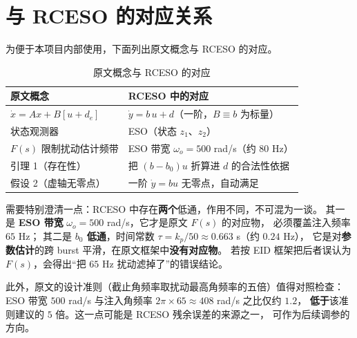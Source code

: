 \documentclass[11pt,a4paper]{ctexart}
\begin{document}
\appendix
\section{与 RCESO 的对应关系}

为便于本项目内部使用，下面列出原文概念与 RCESO 的对应。

\begin{table}[h]
\centering
\caption{原文概念与 RCESO 的对应}
\begin{tabular}{@{}ll@{}}
\toprule
原文概念 & RCESO 中的对应 \\
\midrule
$\dot x=Ax+B[u+d_e]$ & $\dot y=b\,u+d$（一阶，$B\equiv b$ 为标量） \\
状态观测器 & ESO（状态 $z_1$、$z_2$）\\
$F(s)$ 限制扰动估计频带 & ESO 带宽 $\omega_o=500$ rad/s（约 $80$ Hz）\\
引理 1（存在性） & 把 $(b-b_0)u$ 折算进 $d$ 的合法性依据 \\
假设 2（虚轴无零点） & 一阶 $\dot y=bu$ 无零点，自动满足 \\
\bottomrule
\end{tabular}
\end{table}

需要特别澄清一点：RCESO 中存在\textbf{两个}低通，作用不同，不可混为一谈。
其一是 \textbf{ESO 带宽} $\omega_o=500$ rad/s，它才是原文 $F(s)$ 的对应物，
必须覆盖注入频率 $65$ Hz；
其二是 \textbf{$b_0$ 低通}，时间常数 $\tau=k_p/50\approx0.663$ s（约 $0.24$ Hz），
它是对\textbf{参数估计}的跨 burst 平滑，在原文框架中\textbf{没有对应物}。
若按 EID 框架把后者误认为 $F(s)$，会得出“把 $65$ Hz 扰动滤掉了”的错误结论。

此外，原文的设计准则（截止角频率取扰动最高角频率的五倍）值得对照检查：
ESO 带宽 $500$ rad/s 与注入角频率 $2\pi\times 65\approx408$ rad/s 之比仅约 $1.2$，
\textbf{低于}该准则建议的 $5$ 倍。这一点可能是 RCESO 残余误差的来源之一，
可作为后续调参的方向。
\end{document}
